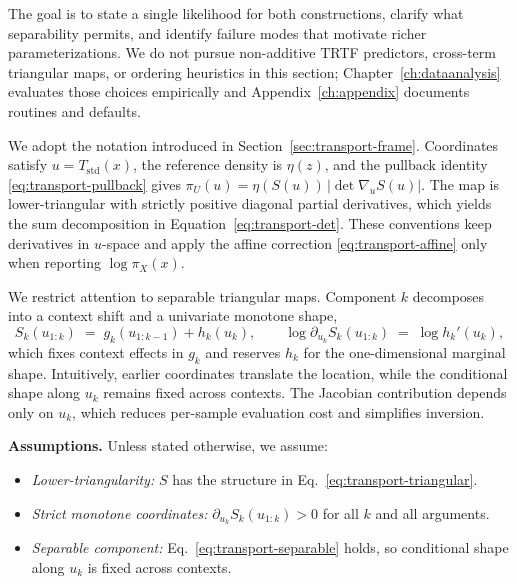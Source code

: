 \documentclass[11pt,a4paper,twoside]{book}\usepackage[]{graphicx}\usepackage[]{xcolor}
\begin{document}
The goal is to state a single likelihood for both constructions, clarify what separability permits, and identify failure modes that motivate richer parameterizations. We do not pursue non-additive TRTF predictors, cross-term triangular maps, or ordering heuristics in this section; Chapter~\ref{ch:dataanalysis} evaluates those choices empirically and Appendix~\ref{ch:appendix} documents routines and defaults.

We adopt the notation introduced in Section~\ref{sec:transport-frame}. Coordinates satisfy $u=T_{\mathrm{std}}(x)$, the reference density is $\eta(z)$, and the pullback identity \eqref{eq:transport-pullback} gives $\pi_U(u)=\eta(S(u))\,|\det\nabla_u S(u)|$. The map is lower-triangular with strictly positive diagonal partial derivatives, which yields the sum decomposition in Equation~\eqref{eq:transport-det}. These conventions keep derivatives in $u$-space and apply the affine correction \eqref{eq:transport-affine} only when reporting $\log \pi_X(x)$.

We restrict attention to separable triangular maps. Component $k$ decomposes into a context shift and a univariate monotone shape,
\begin{equation}
  S_k(u_{1:k}) \;=\; g_k(u_{1:k-1}) + h_k(u_k),\qquad \log \partial_{u_k}S_k(u_{1:k}) \;=\; \log h_k'(u_k),\label{eq:transport-separable}
\end{equation}
which fixes context effects in $g_k$ and reserves $h_k$ for the one-dimensional marginal shape. Intuitively, earlier coordinates translate the location, while the conditional shape along $u_k$ remains fixed across contexts. The Jacobian contribution depends only on $u_k$, which reduces per-sample evaluation cost and simplifies inversion.

\begin{shaded}
\textbf{Assumptions.} Unless stated otherwise, we assume:
\begin{itemize}
  \item \emph{Lower-triangularity:} $S$ has the structure in Eq.~\eqref{eq:transport-triangular}.
  \item \emph{Strict monotone coordinates:} $\partial_{u_k} S_k(u_{1:k}) > 0$ for all $k$ and all arguments.
  \item \emph{Separable component:} Eq.~\eqref{eq:transport-separable} holds, so conditional shape along $u_k$ is fixed across contexts.
\end{itemize}
\end{shaded}
\end{document}
